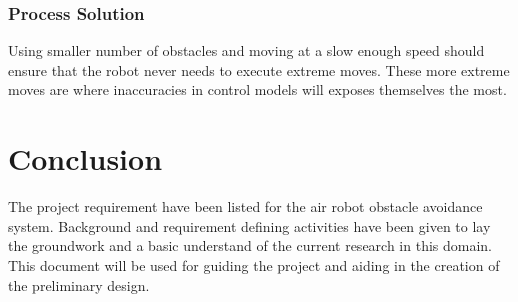 \documentclass{article}
\begin{document}
		\subsubsection{Process Solution}
		
		Using smaller number of obstacles and moving at a slow enough speed should ensure that the robot never needs to execute extreme moves. These more extreme moves are where inaccuracies in control models will exposes themselves the most. 
	

\section{Conclusion}

The project requirement have been listed for the air robot obstacle avoidance system. Background and requirement defining activities have been given to lay the groundwork and a basic understand of the current research in this domain. This document will be used for guiding the project and aiding in the creation of the preliminary design. 


\printbibliography

\end{document}
